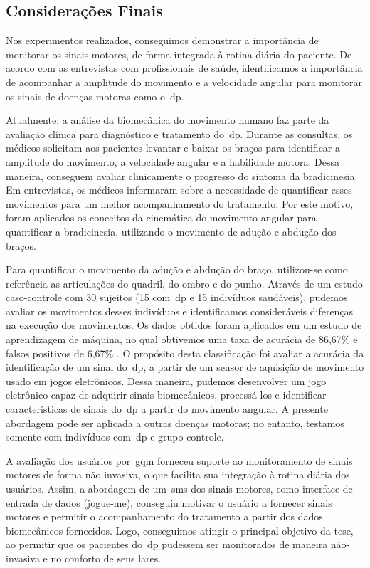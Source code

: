 \subsection{Considerações Finais}\label{sec:cons_finais}

Nos experimentos realizados, conseguimos demonstrar a importância de monitorar os sinais motores, de forma integrada à rotina diária do paciente. De acordo com as entrevistas com profissionais de saúde, identificamos a importância de acompanhar a amplitude do movimento e a velocidade angular para monitorar os sinais de doenças motoras como o~\ac{dp}.

Atualmente, a análise da biomecânica do movimento humano faz parte da avaliação clínica para diagnóstico e tratamento do~\ac{dp}. Durante as consultas, os médicos solicitam aos pacientes levantar e baixar os braços para identificar a amplitude do movimento, a velocidade angular e a habilidade motora. Dessa maneira, conseguem avaliar clinicamente o progresso do sintoma da bradicinesia. Em entrevistas, os médicos informaram sobre a necessidade de quantificar esses movimentos para um melhor acompanhamento do tratamento. Por este motivo, foram aplicados os conceitos da cinemática do movimento angular para quantificar a bradicinesia, utilizando o movimento de adução e abdução dos braços.

Para quantificar o movimento da adução e abdução do braço, utilizou-se como referência as articulações do quadril, do ombro e do punho. Através de um estudo caso-controle com 30 sujeitos (15 com~\ac{dp} e 15 indivíduos saudáveis), pudemos avaliar os movimentos desses indivíduos e identificamos consideráveis diferenças na execução dos movimentos. Os dados obtidos foram aplicados em um estudo de aprendizagem de máquina, no qual obtivemos uma taxa de acurácia de 86,67\% e falsos positivos de 6,67\% . O propósito desta classificação foi avaliar a acurácia da identificação de um sinal do~\ac{dp}, a partir de um sensor de aquisição de movimento usado em jogos eletrônicos. Dessa maneira, pudemos desenvolver um jogo eletrônico  capaz de adquirir sinais biomecânicos, processá-los e identificar características de sinais do~\ac{dp} a partir do movimento angular. A presente abordagem pode ser aplicada a outras doenças motoras; no entanto, testamos somente com indivíduos com~\ac{dp} e grupo controle.

A avaliação dos usuários por~\ac{gqm} forneceu suporte ao monitoramento de sinais motores de forma não invasiva, o que facilita sua integração à rotina diária dos usuários. Assim, a abordagem de um~\ac{sms} dos sinais motores, como interface de entrada de dados (\ac{jogue-me}), conseguiu motivar o usuário  a fornecer sinais motores e permitir o acompanhamento do tratamento a partir dos dados biomecânicos fornecidos. Logo, conseguimos atingir o principal objetivo da tese, ao permitir que os pacientes do~\ac{dp} pudessem ser monitorados de maneira não-invasiva e no conforto de seus lares.


